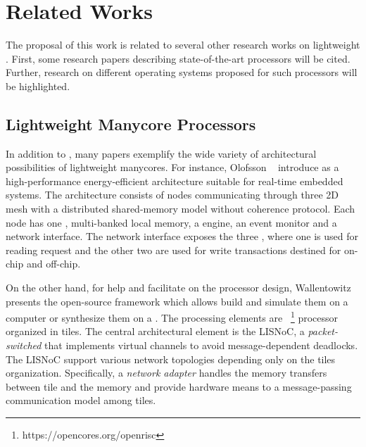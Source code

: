 \chapter{Related Works}
\label{ch.related-works}

The proposal of this work is related to several other research works
on lightweight \manycores.
First, some research papers describing state-of-the-art \manycores
processors will be cited. Further, research on different operating
systems proposed for such processors will be highlighted.

\section{Lightweight Manycore Processors}

	In addition to \mppa, many papers exemplify the wide variety of architectural
	possibilities of lightweight manycores.
	For instance, Olofsson \etal~\cite{olofsson2014} introduce \epiphany as a
	high-performance energy-efficient \manycore architecture suitable for
	real-time embedded systems.
	The architecture consists of nodes communicating through three 2D mesh \nocs
	with a distributed shared-memory model without coherence protocol.
	Each node has one \risc \cpu, multi-banked local memory, a \dma engine,
	an event monitor and a network interface.
	The network interface exposes the three \nocs, where one is used for reading
	request and the other two are used for write transactions destined for on-chip
	and off-chip.


	On the other hand, for help and facilitate on the \manycore processor design,
	Wallentowitz \etal~\cite{Wallentowitz2013} presents the open-source framework
	\optimsoc which allows build \manycore \soc and simulate them on a computer or
	synthesize them on a \fpga.
	The processing elements are \openrisc~\footnote{https://opencores.org/openrisc}
	processor organized in tiles.
	The central architectural element is the LISNoC, a \textit{packet-switched \noc}
	that implements virtual channels to avoid message-dependent deadlocks.
	The LISNoC support various network topologies depending only on the tiles organization.
	Specifically, a \textit{network adapter} handles the memory transfers between
	tile and the memory and provide hardware means to a message-passing communication
	model among tiles.

